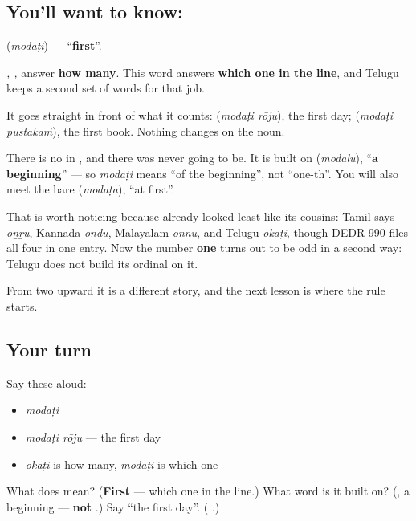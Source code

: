 \subsection*{You'll want to know: }
\textbf{} (\emph{modaṭi}) — \textquotedblleft{}\textbf{first}\textquotedblright{}.

\emph{, , } answer \textbf{how many}. This word answers \textbf{which one in the line}, and Telugu keeps a second set of words for that job.

It goes straight in front of what it counts: \textbf{ } (\emph{modaṭi rōju}), the first day; \textbf{ } (\emph{modaṭi pustakaṁ}), the first book. Nothing changes on the noun.

\begin{cousinweb}
There is no \textbf{} in \textbf{}, and there was never going to be. It is built on \textbf{} (\emph{modalu}), \textquotedblleft{}\textbf{a beginning}\textquotedblright{} — so \emph{modaṭi} means \textquotedblleft{}of the beginning\textquotedblright{}, not \textquotedblleft{}one-th\textquotedblright{}. You will also meet the bare \textbf{} (\emph{modaṭa}), \textquotedblleft{}at first\textquotedblright{}.

That is worth noticing because \emph{} already looked least like its cousins: Tamil says \emph{oṉṟu}, Kannada \emph{ondu}, Malayalam \emph{onnu}, and Telugu \emph{okaṭi}, though DEDR 990 files all four in one entry. Now the number \textbf{one} turns out to be odd in a second way: Telugu does not build its ordinal on it.

From two upward it is a different story, and the next lesson is where the rule starts.
\end{cousinweb}

\subsection*{Your turn}
Say these aloud:

\begin{itemize}
\raggedright
  \item \emph{modaṭi}
  \item \emph{modaṭi rōju} — the first day
  \item \emph{okaṭi} is how many, \emph{modaṭi} is which one
\end{itemize}

\begin{tcolorbox}[breakable,colback=teal!4,colframe=teal!35!black,title={Before you move on}]
What does  mean? (\textbf{First} — which one in the line.) What word is it built on? (\textbf{}, a beginning — \textbf{not} .) Say \textquotedblleft{}the first day\textquotedblright{}. (\textbf{ }.)
\end{tcolorbox}
